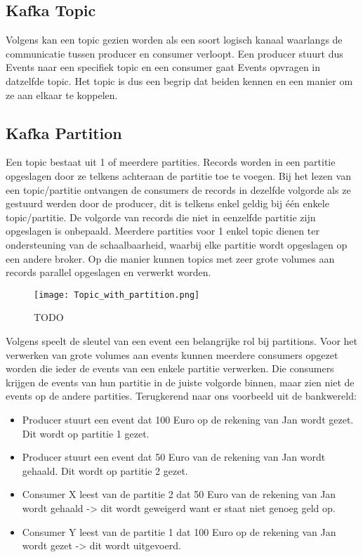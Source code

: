 \subsection{Kafka Topic}
Volgens \textcite{Harbour2023} kan een topic gezien worden als een soort logisch kanaal waarlangs de communicatie tussen producer en consumer verloopt. Een producer stuurt dus Events naar een specifiek topic en een consumer gaat Events opvragen in datzelfde topic. Het topic is dus een begrip dat beiden kennen en een manier om ze aan elkaar te koppelen.


\subsection{Kafka Partition}
Een topic bestaat uit 1 of meerdere partities. Records worden in een partitie opgeslagen door ze telkens achteraan de partitie toe te voegen. Bij het lezen van een topic/partitie ontvangen de consumers de records in dezelfde volgorde als ze gestuurd werden door de producer, dit is telkens enkel geldig bij één enkele topic/partitie. De volgorde van records die niet in eenzelfde partitie zijn opgeslagen is onbepaald.
Meerdere partities voor 1 enkel topic dienen ter ondersteuning van de schaalbaarheid, waarbij elke partitie wordt opgeslagen op een andere broker. Op die manier kunnen topics met zeer grote volumes aan records parallel opgeslagen en verwerkt worden.
\newline
\newline
\begin{figure}
    \texttt{[image: Topic\_with\_partition.png]}
    \caption{TODO \autocite{Harbour2023}}
\end{figure}
\newline
\newline
Volgens \textcite{Harbour2023} speelt de sleutel van een event een belangrijke rol bij partitions. Voor het verwerken van grote volumes aan events kunnen meerdere consumers opgezet worden die ieder de events van een enkele partitie verwerken. Die consumers krijgen de events van hun partitie in de juiste volgorde binnen, maar zien niet de events op de andere partities. Terugkerend naar ons voorbeeld uit de bankwereld:
\begin{itemize}
    \item Producer stuurt een event dat 100 Euro op de rekening van Jan wordt gezet. Dit wordt op partitie 1 gezet.
    \item Producer stuurt een event dat 50 Euro van de rekening van Jan wordt gehaald. Dit wordt op partitie 2 gezet.
    \item Consumer X leest van de partitie 2 dat 50 Euro van de rekening van Jan wordt gehaald -> dit wordt geweigerd want er staat niet genoeg geld op.
    \item Consumer Y leest van de partitie 1 dat 100 Euro op de rekening van Jan wordt gezet -> dit wordt uitgevoerd.
\end{itemize}

